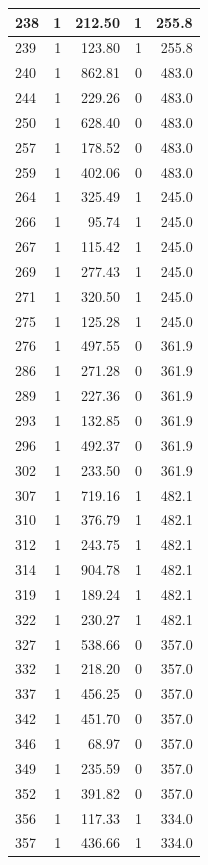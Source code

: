 \documentclass[
  12pt,
]{book}
\begin{document}
\begin{tabular}{l|r|r|r|r}
\hline
238 & 1 & 212.50 & 1 & 255.8\\
\hline
239 & 1 & 123.80 & 1 & 255.8\\
\hline
240 & 1 & 862.81 & 0 & 483.0\\
\hline
244 & 1 & 229.26 & 0 & 483.0\\
\hline
250 & 1 & 628.40 & 0 & 483.0\\
\hline
257 & 1 & 178.52 & 0 & 483.0\\
\hline
259 & 1 & 402.06 & 0 & 483.0\\
\hline
264 & 1 & 325.49 & 1 & 245.0\\
\hline
266 & 1 & 95.74 & 1 & 245.0\\
\hline
267 & 1 & 115.42 & 1 & 245.0\\
\hline
269 & 1 & 277.43 & 1 & 245.0\\
\hline
271 & 1 & 320.50 & 1 & 245.0\\
\hline
275 & 1 & 125.28 & 1 & 245.0\\
\hline
276 & 1 & 497.55 & 0 & 361.9\\
\hline
286 & 1 & 271.28 & 0 & 361.9\\
\hline
289 & 1 & 227.36 & 0 & 361.9\\
\hline
293 & 1 & 132.85 & 0 & 361.9\\
\hline
296 & 1 & 492.37 & 0 & 361.9\\
\hline
302 & 1 & 233.50 & 0 & 361.9\\
\hline
307 & 1 & 719.16 & 1 & 482.1\\
\hline
310 & 1 & 376.79 & 1 & 482.1\\
\hline
312 & 1 & 243.75 & 1 & 482.1\\
\hline
314 & 1 & 904.78 & 1 & 482.1\\
\hline
319 & 1 & 189.24 & 1 & 482.1\\
\hline
322 & 1 & 230.27 & 1 & 482.1\\
\hline
327 & 1 & 538.66 & 0 & 357.0\\
\hline
332 & 1 & 218.20 & 0 & 357.0\\
\hline
337 & 1 & 456.25 & 0 & 357.0\\
\hline
342 & 1 & 451.70 & 0 & 357.0\\
\hline
346 & 1 & 68.97 & 0 & 357.0\\
\hline
349 & 1 & 235.59 & 0 & 357.0\\
\hline
352 & 1 & 391.82 & 0 & 357.0\\
\hline
356 & 1 & 117.33 & 1 & 334.0\\
\hline
357 & 1 & 436.66 & 1 & 334.0\\

\end{tabular}
\end{document}
